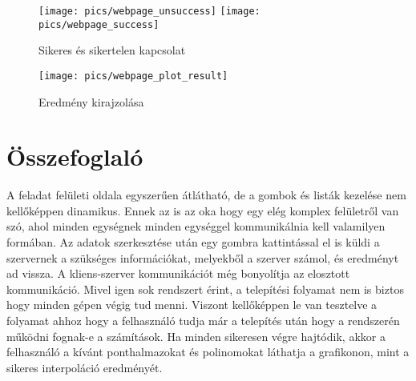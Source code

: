 	\begin{figure}[h]
		\texttt{[image: pics/webpage\_unsuccess]}
		\texttt{[image: pics/webpage\_success]}
		\centering
		\caption{Sikeres és sikertelen kapcsolat\label{fig:webpage_unsuccess}}
	\end{figure}

	\begin{figure}[h]
		\texttt{[image: pics/webpage\_plot\_result]}
		\centering
		\caption{Eredmény kirajzolása\label{fig:webpage_plot_result}}
	\end{figure}


\newpage
\section{Összefoglaló}
	A feladat felületi oldala egyszerűen átlátható, de a gombok és listák kezelése nem kellőképpen dinamikus. Ennek az is az oka hogy egy elég komplex felületről van szó, ahol minden egységnek minden egységgel kommunikálnia kell valamilyen formában. \newline
	Az adatok szerkesztése után egy gombra kattintással el is küldi a szervernek a szükséges információkat, melyekből a szerver számol, és eredményt ad vissza.
	\newline
	A kliens-szerver kommunikációt még bonyolítja az elosztott kommunikáció.
	Mivel igen sok rendszert érint, a telepítési folyamat nem is biztos hogy minden gépen végig tud menni. \newline
	Viszont kellőképpen le van tesztelve a folyamat ahhoz hogy a felhasználó tudja már a telepítés után hogy a rendszerén működni fognak-e a számítások. \newline
	Ha minden sikeresen végre hajtódik, akkor a felhasználó a kívánt ponthalmazokat és polinomokat láthatja a grafikonon, mint a sikeres interpoláció eredményét.
